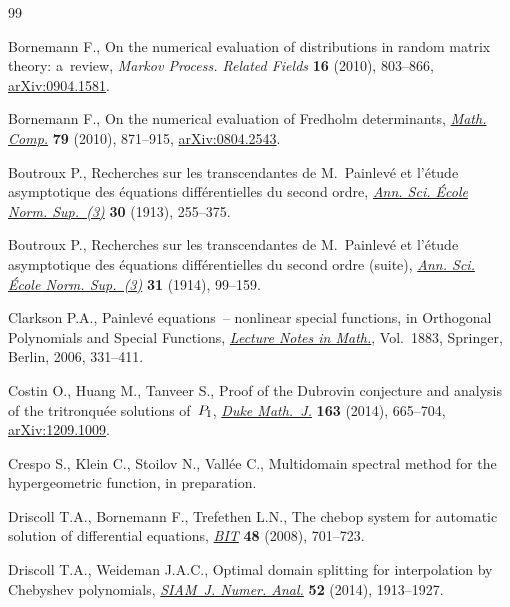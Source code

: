 \documentclass[pdftex]{sigma}
\begin{document}
\begin{thebibliography}{99}
\footnotesize\itemsep=0pt

Bornemann F., On the numerical evaluation of distributions in random matrix
 theory: a~review, \textit{Markov Process. Related Fields} \textbf{16} (2010),
 803--866, \href{https://arxiv.org/abs/0904.1581}{arXiv:0904.1581}.

Bornemann F., On the numerical evaluation of {F}redholm determinants,
 \href{https://doi.org/10.1090/S0025-5718-09-02280-7}{\textit{Math. Comp.}} \textbf{79} (2010), 871--915, \href{https://arxiv.org/abs/0804.2543}{arXiv:0804.2543}.

Boutroux P., Recherches sur les transcendantes de {M}.~{P}ainlev\'e et
 l'\'etude asymptotique des \'equations diff\'erentielles du second ordre,
 \href{https://doi.org/10.24033/asens.661}{\textit{Ann. Sci. \'Ecole Norm. Sup.~(3)}} \textbf{30} (1913), 255--375.

Boutroux P., Recherches sur les transcendantes de {M}.~{P}ainlev\'e et
 l'\'etude asymptotique des \'equations diff\'erentielles du second ordre
 (suite), \href{https://doi.org/10.24033/asens.672}{\textit{Ann. Sci. \'Ecole Norm. Sup.~(3)}} \textbf{31} (1914),
 99--159.

Clarkson P.A., Painlev\'e equations~-- nonlinear special functions, in
 Orthogonal Polynomials and Special Functions, \href{https://doi.org/10.1007/978-3-540-36716-1_7}{\textit{Lecture Notes in
 Math.}}, Vol.~1883, Springer, Berlin, 2006, 331--411.

Costin O., Huang M., Tanveer S., Proof of the {D}ubrovin conjecture and
 analysis of the tritronqu\'ee solutions of~{$P_{\rm I}$}, \href{https://doi.org/10.1215/00127094-2429589}{\textit{Duke Math.~J.}}
 \textbf{163} (2014), 665--704, \href{https://arxiv.org/abs/1209.1009}{arXiv:1209.1009}.

Crespo S., Klein C., Stoilov N., Vall\'ee C., Multidomain spectral method for
 the hypergeometric function, in preparation.

Driscoll T.A., Bornemann F., Trefethen L.N., The chebop system for automatic
 solution of differential equations, \href{https://doi.org/10.1007/s10543-008-0198-4}{\textit{BIT}} \textbf{48} (2008),
 701--723.

Driscoll T.A., Weideman J.A.C., Optimal domain splitting for interpolation by
 {C}hebyshev polynomials, \href{https://doi.org/10.1137/130919428}{\textit{SIAM~J. Numer. Anal.}} \textbf{52} (2014),
 1913--1927.


\end{thebibliography}
\end{document}
